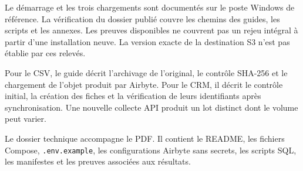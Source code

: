 \documentclass[11pt,a4paper]{article}
\newcommand{\code}[1]{\texttt{#1}}
\begin{document}
Le démarrage et les trois chargements sont documentés sur le poste
Windows de référence. La vérification du dossier publié couvre les
chemins des guides, les scripts et les annexes. Les preuves disponibles
ne couvrent pas un rejeu intégral à partir d'une installation neuve.
La version exacte de la destination S3 n'est pas établie par ces relevés.

Pour le CSV, le guide décrit l'archivage de l'original, le contrôle
SHA-256 et le chargement de l'objet produit par Airbyte. Pour le CRM,
il décrit le contrôle initial, la création des fiches et la vérification
de leurs identifiants après synchronisation. Une nouvelle collecte
API produit un lot distinct dont le volume peut varier.

Le dossier technique accompagne le PDF. Il contient le README,
les fichiers Compose, \code{.env.example}, les configurations
Airbyte sans secrets, les scripts SQL, les manifestes et les preuves
associées aux résultats.
\end{document}
